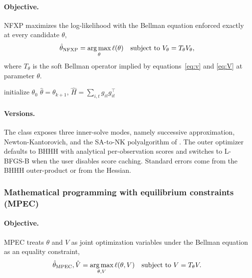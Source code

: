 \paragraph{Objective.} NFXP \citep{rust1987} maximizes the log-likelihood with the Bellman equation enforced exactly at every candidate $\theta$,
\begin{equation}
\hat\theta_{\mathrm{NFXP}} = \operatorname*{arg\,max}_{\theta} \ell(\theta) \quad \text{subject to } V_\theta = T_\theta V_\theta,
\label{eq:nfxp}
\end{equation}
where $T_\theta$ is the soft Bellman operator implied by equations~\eqref{eq:v} and \eqref{eq:V} at parameter $\theta$.

\begin{algorithm}[H]
\SetAlgoLined
initialize $\theta_0$\;
\Return $\hat\theta = \theta_{k+1}$, $\hat H = \sum_{i,t} g_{it} g_{it}^\top$\;
\caption{NFXP outer loop}
\end{algorithm}

\paragraph{Versions.} The  class exposes three inner-solve modes, namely successive approximation, Newton-Kantorovich, and the SA-to-NK polyalgorithm of \citet{iskhakov2016}. The outer optimizer defaults to BHHH with analytical per-observation scores and switches to L-BFGS-B when the user disables score caching. Standard errors come from the BHHH outer-product or from the Hessian.

\subsubsection{Mathematical programming with equilibrium constraints (MPEC)}

\paragraph{Objective.} MPEC \citep{su2012} treats $\theta$ and $V$ as joint optimization variables under the Bellman equation as an equality constraint,
\begin{equation}
\hat\theta_{\mathrm{MPEC}}, \hat V = \operatorname*{arg\,max}_{\theta, V} \ell(\theta, V) \quad \text{subject to } V = T_\theta V.
\label{eq:mpec}
\end{equation}

